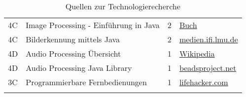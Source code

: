 \begin{longtable}{c l c l}
        	4C 
			& Image Processing - Einführung in Java 
			& 2 
			& \href{ http://imagingbook.com/}{Buch} \\
        	4C 
			& Bilderkennung mittels Java 
			& 2 
			& \href{https://www.medien.ifi.lmu.de/lehre/ss07/mt/mtB3b.pdf}{medien.ifi.lmu.de} \\
        	4D 
			& Audio Processing Übersicht 
			& 1 
			& \href{http://en.wikipedia.org/wiki/Audio_signal_processing}{Wikipedia} \\
        	4D 
			& Audio Processing Java Library 
			& 1 
			& \href{http://www.beadsproject.net/}{beadsproject.net} \\
        	3C 
			& Programmierbare Fernbedienungen 
			& 1 
			& \href{http://lifehacker.com/5901930/five-best-universal-remote-controls}{lifehacker.com} \\
		\caption{Quellen zur Technologierecherche}
	\end{longtable}
